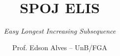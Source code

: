 \title{SPOJ ELIS}
\subtitle{\textit{Easy Longest Increasing Subsequence}}
\author{Prof. Edson Alves -- UnB/FGA}
\date{}
